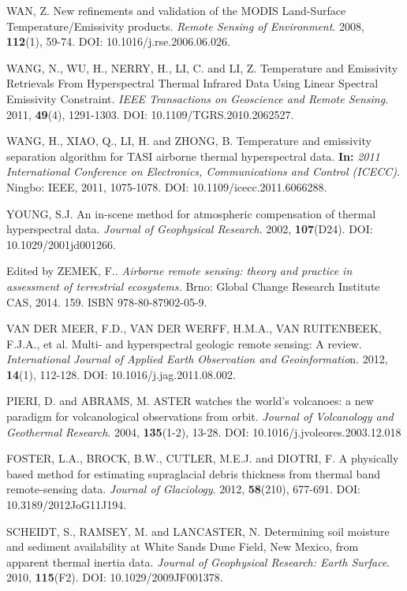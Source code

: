 \begin{thebibliography}{10}
 WAN, Z. New refinements and validation of the MODIS Land-Surface Temperature/Emissivity products. \textit{Remote Sensing of Environment}. 2008, \textbf{112}(1), 59-74. DOI: 10.1016/j.rse.2006.06.026. 

 WANG, N., WU, H., NERRY, H., LI, C. and LI, Z. Temperature and Emissivity Retrievals From Hyperspectral Thermal Infrared Data Using Linear Spectral Emissivity Constraint. \textit{IEEE Transactions on Geoscience and Remote Sensing}. 2011, \textbf{49}(4), 1291-1303. DOI: 10.1109/TGRS.2010.2062527.

 WANG, H., XIAO, Q., LI, H. and ZHONG, B. Temperature and emissivity separation algorithm for TASI airborne thermal hyperspectral data. \textbf{In:} \textit{2011 International Conference on Electronics, Communications and Control (ICECC)}. Ningbo: IEEE, 2011, 1075-1078. DOI: 10.1109/icecc.2011.6066288.

 YOUNG, S.J. An in-scene method for atmospheric compensation of thermal hyperspectral data. \textit{Journal of Geophysical Research}. 2002, \textbf{107}(D24). DOI: 10.1029/2001jd001266.

 Edited by ZEMEK, F.. \textit{Airborne remote sensing: theory and practice in assessment of terrestrial ecosystems.} Brno: Global Change Research Institute CAS, 2014. 159. ISBN 978-80-87902-05-9.


 VAN DER MEER, F.D., VAN DER WERFF, H.M.A., VAN RUITENBEEK, F.J.A., et al. Multi- and hyperspectral geologic remote sensing: A review. \textit{International Journal of Applied Earth Observation and Geoinformatio}n. 2012, \textbf{14}(1), 112-128. DOI: 10.1016/j.jag.2011.08.002.

 PIERI, D. and ABRAMS, M. ASTER watches the world's volcanoes: a new paradigm for volcanological observations from orbit. \textit{Journal of Volcanology
  and Geothermal Research}. 2004, \textbf{135}(1-2), 13-28. DOI: 10.1016/j.jvoleores.2003.12.018

 FOSTER, L.A., BROCK, B.W., CUTLER, M.E.J. and DIOTRI, F. A physically based method for estimating supraglacial debris thickness from thermal band remote-sensing data. \textit{Journal of Glaciology}. 2012, \textbf{58}(210), 677-691. DOI: 10.3189/2012JoG11J194. 

 SCHEIDT, S., RAMSEY, M. and LANCASTER, N. Determining soil moisture and sediment availability at White Sands Dune Field, New Mexico, from apparent thermal inertia data. \textit{Journal of Geophysical Research: Earth Surface}. 2010, \textbf{115}(F2). DOI: 10.1029/2009JF001378.


\end{thebibliography}
